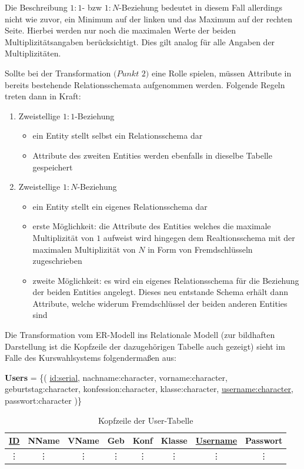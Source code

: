 Die Beschreibung $1:1$- bzw $1:N$-Beziehung bedeutet in diesem Fall allerdings nicht wie zuvor, ein Minimum auf der linken und das Maximum auf der rechten Seite. 
Hierbei werden nur noch die maximalen Werte der beiden Multiplizitätsangaben berücksichtigt. Dies gilt analog für alle Angaben der Multiplizitäten.

Sollte bei der Transformation $(Punkt$ $2)$ eine Rolle spielen, müssen Attribute in bereits bestehende Relationsschemata aufgenommen werden. Folgende Regeln treten dann in Kraft:
\begin{enumerate}
 \item Zweistellige $1:1$-Beziehung
 \begin{itemize}
  \item ein Entity stellt selbst ein Relationsschema dar
  \item Attribute des zweiten Entities werden ebenfalls in dieselbe Tabelle gespeichert
 \end{itemize}
 \item Zweistellige $1:N$-Beziehung
 \begin{itemize}
  \item ein Entity stellt ein eigenes Relationsschema dar
  \item erste Möglichkeit: die Attribute des Entities welches die maximale Multiplizität von $1$ aufweist wird hingegen dem Realtionsschema mit der maximalen Multiplizität von $N$ in Form von Fremdschlüsseln zugeschrieben
  \item zweite Möglichkeit: es wird ein eigenes Relationsschema für die Beziehung der beiden Entities angelegt. Dieses neu entstande Schema erhält dann Attribute, welche widerum Fremdschlüssel der beiden anderen Entities sind
 \end{itemize}
\end{enumerate}

Die Transformation vom \ac{ER-Modell} ins Relationale Modell (zur bildhaften Darstellung ist die Kopfzeile der dazugehörigen Tabelle auch gezeigt) sieht im Falle des Kurswahlsystems folgendermaßen aus:

\textbf{Users} = \{( \underline{id:serial}, nachname:character, vorname:character, geburtstag:character, konfession:character, klasse:character, \underline{username:character}, passwort:character )\}

\begin{table}[H]
\begin{center}
	\begin{tabular}{|c|c|c|c|c|c|c|c|}\hline
		\textbf{\underline{ID}} & \textbf{NName} & \textbf{VName} & \textbf{Geb} & \textbf{Konf} & \textbf{Klasse} & \textbf{\underline{Username}} & \textbf{Passwort} \\ \hline
		\vdots & \vdots & \vdots & \vdots & \vdots & \vdots & \vdots & \vdots \\
	\end{tabular}
	\caption{Kopfzeile der User-Tabelle}
\end{center}
\end{table}


